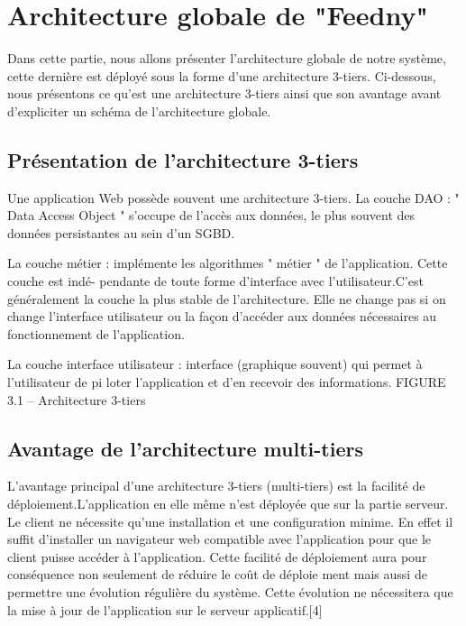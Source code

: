\section{Architecture globale de "Feedny"}
Dans cette partie, nous allons présenter l'architecture globale de notre système, cette dernière est déployé sous la forme d'une architecture 3-tiers. Ci-dessous, nous présentons ce qu'est une architecture 3-tiers ainsi que son avantage avant d'expliciter un schéma de l'architecture globale.
\subsection{Présentation de l'architecture 3-tiers}

Une application Web possède souvent une architecture 3-tiers.
La couche DAO : " Data Access Object " s'occupe de l'accès aux données, le plus souvent des
données persistantes au sein d'un SGBD.

La couche métier : implémente les algorithmes " métier " de l'application. Cette couche est indé-
pendante de toute forme d'interface avec l'utilisateur.C'est généralement la couche la plus
stable de l'architecture. Elle ne change pas si on change l'interface utilisateur ou la façon
d'accéder aux données nécessaires au fonctionnement de l'application.

La couche interface utilisateur : interface (graphique souvent) qui permet à l'utilisateur de pi
loter l'application et d'en recevoir des informations.
FIGURE 3.1 – Architecture 3-tiers


\subsection{Avantage de l'architecture multi-tiers}
L'avantage principal d'une architecture 3-tiers (multi-tiers) est la facilité de déploiement.L'application
en elle même n'est déployée que sur la partie serveur.
Le client ne nécessite qu'une installation et une configuration minime.
En effet il suffit d'installer un navigateur web compatible avec l'application pour que le client
puisse accéder à l'application.
Cette facilité de déploiement aura pour conséquence non seulement de réduire le coût de déploie
ment mais aussi de permettre une évolution régulière du système. Cette évolution ne nécessitera
que la mise à jour de l'application sur le serveur applicatif.[4]









